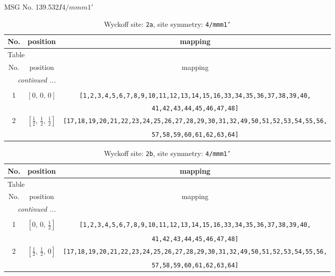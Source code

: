 \documentclass[fleqn,8pt]{jsarticle}
\begin{document}
\setcounter{MaxMatrixCols}{32}

\renewcommand{\tablename}{Table~}
\renewcommand{\figurename}{Figure~}
\begin{center}
\LARGE
MSG No. 139.532\quad$I4/mmm1'$
\end{center}
\renewcommand{\arraystretch}{1.2}
\begin{longtable}{ccc}
\caption{Wyckoff site: {\tt 2a}, site symmetry: {\tt 4/mmm1'}}
 \\
 \hline \hline
No. & position & mapping \\ \hline \endfirsthead

\multicolumn{2}{l}{\tablename\ \thetable{}} \\
 \hline \hline
No. & position & mapping \\ \hline \endhead

 \hline \hline
\multicolumn{2}{r}{\footnotesize\it continued ...} \\ \endfoot

 \hline \hline
\multicolumn{2}{r}{} \\ \endlastfoot

1 & $\left[ 0,\, 0,\, 0 \right]$ & {\tt [1,2,3,4,5,6,7,8,9,10,11,12,13,14,15,16,33,34,35,36,37,38,39,40,} \\ \hline
 &  & {\tt 41,42,43,44,45,46,47,48]} \\ \hline
2 & $\left[ \frac{1}{2},\, \frac{1}{2},\, \frac{1}{2} \right]$ & {\tt [17,18,19,20,21,22,23,24,25,26,27,28,29,30,31,32,49,50,51,52,53,54,55,56,} \\ \hline
 &  & {\tt 57,58,59,60,61,62,63,64]} \\
\end{longtable}
\renewcommand{\arraystretch}{1.2}
\begin{longtable}{ccc}
\caption{Wyckoff site: {\tt 2b}, site symmetry: {\tt 4/mmm1'}}
 \\
 \hline \hline
No. & position & mapping \\ \hline \endfirsthead

\multicolumn{2}{l}{\tablename\ \thetable{}} \\
 \hline \hline
No. & position & mapping \\ \hline \endhead

 \hline \hline
\multicolumn{2}{r}{\footnotesize\it continued ...} \\ \endfoot

 \hline \hline
\multicolumn{2}{r}{} \\ \endlastfoot

1 & $\left[ 0,\, 0,\, \frac{1}{2} \right]$ & {\tt [1,2,3,4,5,6,7,8,9,10,11,12,13,14,15,16,33,34,35,36,37,38,39,40,} \\ \hline
 &  & {\tt 41,42,43,44,45,46,47,48]} \\ \hline
2 & $\left[ \frac{1}{2},\, \frac{1}{2},\, 0 \right]$ & {\tt [17,18,19,20,21,22,23,24,25,26,27,28,29,30,31,32,49,50,51,52,53,54,55,56,} \\ \hline
 &  & {\tt 57,58,59,60,61,62,63,64]} \\
\end{longtable}
\end{document}
